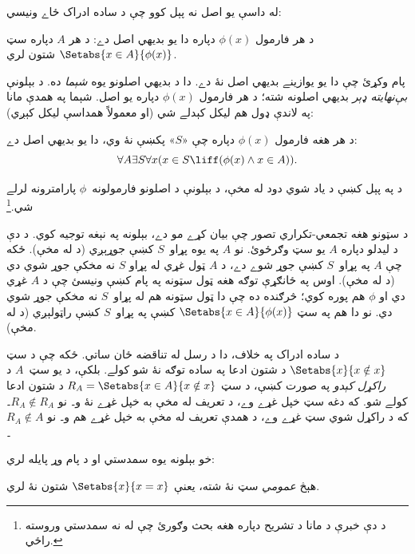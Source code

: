 \documentclass[../../../include/open-logic-section]{subfiles}
\begin{document}

له داسې يو اصل نه پېل کوو چې د ساده ادراک ځاے ونيسي:

\begin{axiom} د هر فارمول $\phi(x)$ دپاره دا يو
بديهي اصل دے: د هر $A$ دپاره سټ $\Setabs{x \in A}{\phi(x)}$ شتون لري.
\end{axiom}

پام وکړئ چې دا يو يوازينے بديهي اصل نۀ دے. دا د بديهي اصلونو
يوه \emph{شېما} ده. د بېلونې \emph{بې‌نهايته ډېر} بديهي اصلونه
شته؛ د هر فارمول $\phi(x)$ دپاره يو اصل. شېما په همدې مانا
په لاندې ډول هم ليکل کېدلے شي (او معمولاً همداسې ليکل کېږي):

\begin{defish}
د هر هغه فارمول $\phi(x)$ دپاره چې «$S$» پکښې نۀ وي، دا يو
بديهي اصل دے:
\[
	\forall A \exists S \forall x(x \in S \liff (\phi(x) \land x \in A)).
\]
\end{defish}

د  په پېل کښې د ياد شوي دود له مخې،
د بېلونې د اصلونو فارمولونه~$\phi$ پارامترونه لرلے شي.\footnote{د دې
خبرې د مانا د تشريح دپاره هغه بحث وګورئ چې له
 نه سمدستي وروسته راځي.}

د سټونو هغه تجمعي-تکراري تصور چې بيان کړے مو دے، بېلونه په
نېغه توجيه کوي. د دې د ليدلو دپاره $A$ يو سټ وګرځوئ. نو $A$
په يوه پړاو~$S$ کښې جوړېږي (د \stageshier له مخې). ځکه چې $A$
په پړاو~$S$ کښې جوړ شوے دے، د $A$ ټول غړي له پړاو $S$ نه
مخکې جوړ شوي دي (د \stagesacc له مخې). اوس په ځانګړې توګه
هغه ټول سټونه په پام کښې ونيسئ چې د $A$ غړي دي او $\phi$ هم
پوره کوي؛ څرګنده ده چې دا ټول سټونه هم له پړاو~$S$ نه مخکې
جوړ شوي دي. نو دا هم په سټ $\Setabs{x \in A}{\phi(x)}$ کښې په پړاو~$S$
کښې راټولېږي (د \stagesacc له مخې).

د ساده ادراک په خلاف، دا د رسل له تناقضه ځان ساتي. ځکه چې د سټ
$\Setabs{x}{x \notin
x}$ د شتون ادعا په ساده توګه نۀ شو کولے. بلکې، د يو سټ~$A$
د \emph{راکړل کېدو} په صورت کښې، د سټ
$R_A = \Setabs{x \in A}{x \notin x}$ د شتون ادعا کولے شو.
که دغه سټ خپل غړے وے، د تعريف له مخې به خپل غړے نۀ و۔
نو $R_A \notin R_A$۔ که د راکړل شوي سټ غړے وے، د همدې
تعريف له مخې به خپل غړے هم و۔ نو $R_A \notin A$۔

خو بېلونه يوه سمدستي او د پام وړ پايله لري:

\begin{thm}
هېڅ \emph{عمومي} سټ نۀ شته، يعنې $\Setabs{x}{x = x}$ شتون نۀ لري.
\end{thm}
\end{document}
